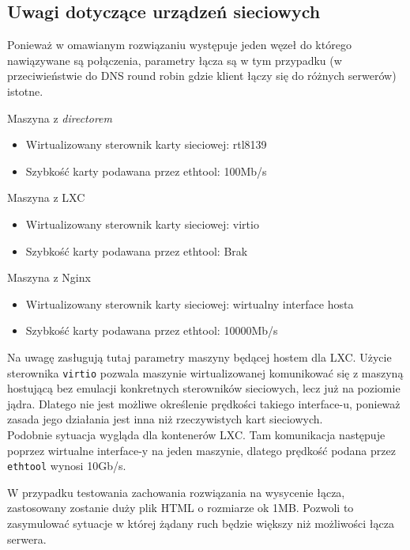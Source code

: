 \subsection{Uwagi dotyczące urządzeń sieciowych}
\label{sub:uwagi_sieciowe}
Ponieważ w omawianym rozwiązaniu występuje jeden węzeł do którego nawiązywane są połączenia, parametry łącza są w tym przypadku (w przeciwieństwie do DNS round robin gdzie klient łączy się do różnych serwerów) istotne.
\begin{description}
	\item{Maszyna z \textit{directorem}}
		\begin{itemize}
			\item Wirtualizowany sterownik karty sieciowej: rtl8139
			\item Szybkość karty podawana przez ethtool: 100Mb/s
		\end{itemize}
	\item{Maszyna z LXC}
		\begin{itemize}
			\item Wirtualizowany sterownik karty sieciowej: virtio
			\item Szybkość karty podawana przez ethtool: Brak
		\end{itemize}
	\item{Maszyna z Nginx}
		\begin{itemize}
			\item Wirtualizowany sterownik karty sieciowej: wirtualny interface hosta
			\item Szybkość karty podawana przez ethtool: 10000Mb/s
		\end{itemize}
\end{description}
Na uwagę zasługują tutaj parametry maszyny będącej hostem dla LXC\@.
Użycie sterownika \texttt{virtio} pozwala maszynie wirtualizowanej komunikować się z maszyną hostującą bez emulacji konkretnych sterowników sieciowych, lecz już na poziomie jądra.
Dlatego nie jest możliwe określenie prędkości takiego interface-u, ponieważ zasada jego działania jest inna niż rzeczywistych kart sieciowych.\\
Podobnie sytuacja wygląda dla kontenerów LXC\@.
Tam komunikacja następuje poprzez wirtualne interface-y na jeden maszynie, dlatego prędkość podana przez \texttt{ethtool} wynosi 10Gb/s.

W przypadku testowania zachowania rozwiązania na wysycenie łącza, zastosowany zostanie duży plik HTML o rozmiarze ok 1MB.
Pozwoli to zasymulować sytuacje w której żądany ruch będzie większy niż możliwości łącza serwera.
